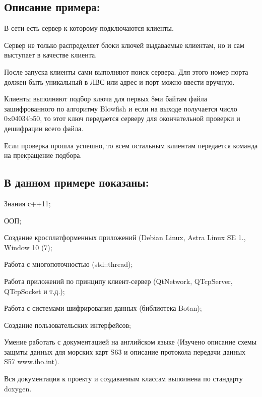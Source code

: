 \subsection*{Описание примера\+:}


\begin{DoxyItemize}
\item В сети есть сервер к которому подключаются клиенты.
\item Сервер не только распределяет блоки ключей выдаваемые клиентам, но и сам выступает в качестве клиента.
\item После запуска клиенты сами выполняют поиск сервера. Для этого номер порта должен быть уникальный в ЛВС или адрес и порт можно ввести вручную.
\item Клиенты выполняют подбор ключа для первых 8ми байтам файла зашифрованного по алгоритму Blowfish и если на выходе получается число 0x04034b50, то этот ключ передается серверу для окончательной проверки и дешифрации всего файла.
\item Если проверка прошла успешно, то всем остальным клиентам передается команда на прекращение подбора.
\end{DoxyItemize}

\subsection*{В данном примере показаны\+:}


\begin{DoxyItemize}
\item Знания с++11;
\item ООП;
\item Создание кросплатформенных приложений (Debian Linux, Astra Linux SE 1., Window 10 (7);
\item Работа с многопоточностью (std\+::thread);
\item Работа приложений по принципу клиент-\/сервер (Qt\+Network, Q\+Tcp\+Server, Q\+Tcp\+Socket и т.\+д.);
\item Работа с системами шифрирования данных (библиотека Botan);
\item Создание пользовательских интерфейсов;
\item Умение работать с документацией на английском языке (Изучено описание схемы защмты данных для морских карт S63 и описание протокола передачи данных S57 www.\+iho.\+int).
\end{DoxyItemize}

Вся документация к проекту и создаваемым классам выполнена по стандарту doxygen. 